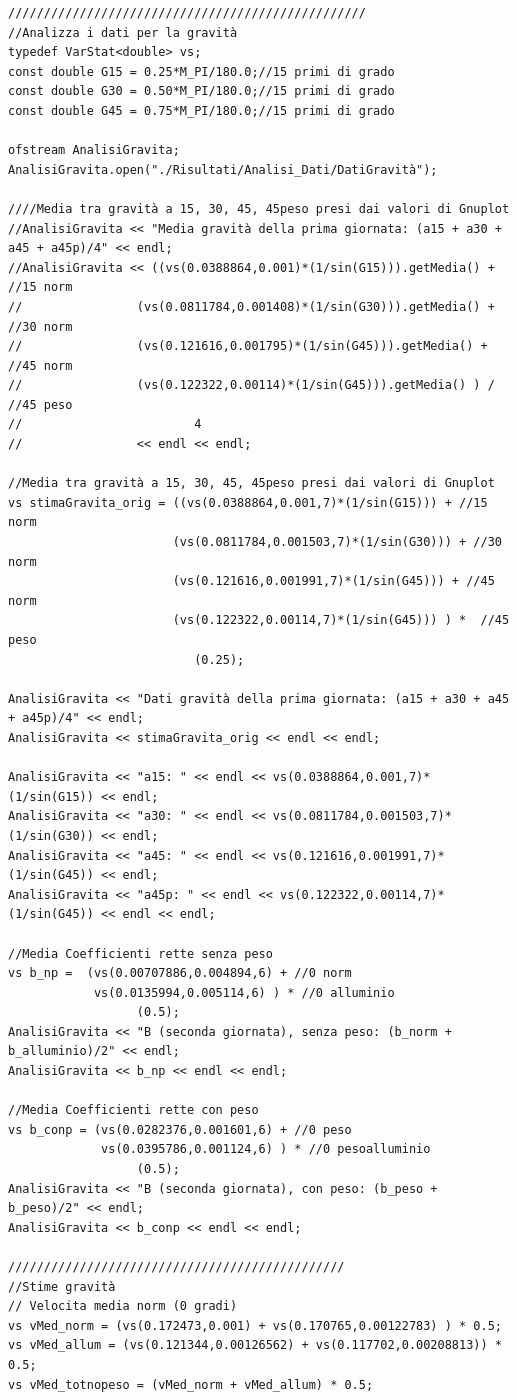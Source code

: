 \documentclass[12pt]{article} %
\begin{document}
\begin{verbatim}
//////////////////////////////////////////////////
//Analizza i dati per la gravità
typedef VarStat<double> vs;
const double G15 = 0.25*M_PI/180.0;//15 primi di grado
const double G30 = 0.50*M_PI/180.0;//15 primi di grado
const double G45 = 0.75*M_PI/180.0;//15 primi di grado

ofstream AnalisiGravita;
AnalisiGravita.open("./Risultati/Analisi_Dati/DatiGravità");

////Media tra gravità a 15, 30, 45, 45peso presi dai valori di Gnuplot
//AnalisiGravita << "Media gravità della prima giornata: (a15 + a30 + a45 + a45p)/4" << endl;
//AnalisiGravita << ((vs(0.0388864,0.001)*(1/sin(G15))).getMedia() + //15 norm
//				  (vs(0.0811784,0.001408)*(1/sin(G30))).getMedia() + //30 norm
//				  (vs(0.121616,0.001795)*(1/sin(G45))).getMedia() + //45 norm
//				  (vs(0.122322,0.00114)*(1/sin(G45))).getMedia() ) / //45 peso
//						  4
//				  << endl << endl;

//Media tra gravità a 15, 30, 45, 45peso presi dai valori di Gnuplot
vs stimaGravita_orig = ((vs(0.0388864,0.001,7)*(1/sin(G15))) + //15 norm
				  	   (vs(0.0811784,0.001503,7)*(1/sin(G30))) + //30 norm
				  	   (vs(0.121616,0.001991,7)*(1/sin(G45))) + //45 norm
				  	   (vs(0.122322,0.00114,7)*(1/sin(G45))) ) *  //45 peso
						  (0.25);

AnalisiGravita << "Dati gravità della prima giornata: (a15 + a30 + a45 + a45p)/4" << endl;
AnalisiGravita << stimaGravita_orig << endl << endl;

AnalisiGravita << "a15: " << endl << vs(0.0388864,0.001,7)*(1/sin(G15)) << endl;
AnalisiGravita << "a30: " << endl << vs(0.0811784,0.001503,7)*(1/sin(G30)) << endl;
AnalisiGravita << "a45: " << endl << vs(0.121616,0.001991,7)*(1/sin(G45)) << endl;
AnalisiGravita << "a45p: " << endl << vs(0.122322,0.00114,7)*(1/sin(G45)) << endl << endl;

//Media Coefficienti rette senza peso
vs b_np =  (vs(0.00707886,0.004894,6) + //0 norm
		  	vs(0.0135994,0.005114,6) ) * //0 alluminio
				  (0.5);
AnalisiGravita << "B (seconda giornata), senza peso: (b_norm + b_alluminio)/2" << endl;
AnalisiGravita << b_np << endl << endl;

//Media Coefficienti rette con peso
vs b_conp = (vs(0.0282376,0.001601,6) + //0 peso
		  	 vs(0.0395786,0.001124,6) ) * //0 pesoalluminio
				  (0.5);
AnalisiGravita << "B (seconda giornata), con peso: (b_peso + b_peso)/2" << endl;
AnalisiGravita << b_conp << endl << endl;

///////////////////////////////////////////////
//Stime gravità
// Velocita media norm (0 gradi)
vs vMed_norm = (vs(0.172473,0.001) + vs(0.170765,0.00122783) ) * 0.5;
vs vMed_allum = (vs(0.121344,0.00126562) + vs(0.117702,0.00208813)) * 0.5;
vs vMed_totnopeso = (vMed_norm + vMed_allum) * 0.5;


\end{verbatim}
\end{document}
